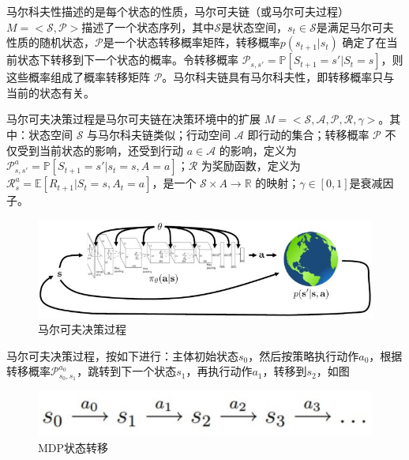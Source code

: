 马尔科夫性描述的是每个状态的性质，马尔可夫链（或马尔可夫过程）$M=<\mathcal{S}, \mathcal{P}>$描述了一个状态序列，其中$\mathcal{S}$是状态空间，$s_t \in \mathcal{S}$是满足马尔可夫性质的随机状态，$\mathcal{P}$是一个状态转移概率矩阵，转移概率$p(s_{t+1}|s_t)$ 确定了在当前状态下转移到下一个状态的概率。令转移概率 $\mathcal{P}_{s, s'}=\mathbb{P}[S_{t+1}=s'|S_t=s]$，则这些概率组成了概率转移矩阵 $\mathcal{P}$。马尔科夫链具有马尔科夫性，即转移概率只与当前的状态有关。

马尔可夫决策过程是马尔可夫链在决策环境中的扩展 $M=<\mathcal{S}, \mathcal{A}, \mathcal{P}, \mathcal{R}, \gamma>$。其中：状态空间 $\mathcal{S}$ 与马尔科夫链类似；行动空间 $\mathcal{A}$ 即行动的集合；转移概率 $\mathcal{P}$ 不仅受到当前状态的影响，还受到行动 $a\in \mathcal{A}$ 的影响，定义为$\mathcal{P}_{s, s'}^{a}=\mathbb{P}[S_{t+1}=s'|s_t=s, A=a]$；$\mathcal{R}$ 为奖励函数，定义为$\mathcal{R}_{s}^{a}=\mathbb{E}[R_{t+1}|S_t=s, A_t=a]$，是一个 $\mathcal{S}\times A\to \mathbb{R}$ 的映射；$\gamma \in [0,1]$是衰减因子。

\begin{figure}[!htbp]\centering
\vspace{1em}
  \includegraphics[width=0.9\linewidth]{figures/MDP.jpg}
  \caption{马尔可夫决策过程}
  \label{fig:MDP}       %
  \vspace{1em}
\end{figure}


马尔可夫决策过程，按如下进行：主体初始状态$s_0$，然后按策略执行动作$a_0$，根据转移概率$\mathcal{P}_{s_0, s_1}^{a_0}$，跳转到下一个状态$s_1$，再执行动作$a_1$，转移到$s_2$，如图
\begin{figure}[!htbp]\centering
\vspace{1em}
  \includegraphics[width=0.9\linewidth]{figures/MDP_trans}
  \caption{MDP状态转移}
  \label{fig:MDP}       %
  \vspace{1em}
\end{figure}

